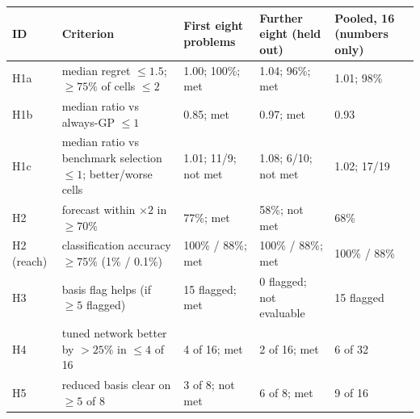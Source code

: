 \begin{tabular}{p{1.3cm}p{4.4cm}p{3.4cm}p{3.6cm}p{3.4cm}}
\toprule
ID & Criterion & First eight problems & Further eight (held out) & Pooled, 16 (numbers only) \\
\midrule
H1a & median regret $\le1.5$; $\ge75\%$ of cells $\le2$ & 1.00; 100\%; met & 1.04; 96\%; met & 1.01; 98\% \\
H1b & median ratio vs always-GP $\le1$ & 0.85; met & 0.97; met & 0.93 \\
H1c & median ratio vs benchmark selection $\le1$; better/worse cells & 1.01; 11/9; not met & 1.08; 6/10; not met & 1.02; 17/19 \\
H2 & forecast within $\times2$ in $\ge70\%$ & 77\%; met & 58\%; not met & 68\% \\
H2 (reach) & classification accuracy $\ge75\%$ (1\% / 0.1\%) & 100\% / 88\%; met & 100\% / 88\%; met & 100\% / 88\% \\
H3 & basis flag helps (if $\ge5$ flagged) & 15 flagged; met & 0 flagged; not evaluable & 15 flagged \\
H4 & tuned network better by $>25\%$ in $\le4$ of 16 & 4 of 16; met & 2 of 16; met & 6 of 32 \\
H5 & reduced basis clear on $\ge5$ of 8 & 3 of 8; not met & 6 of 8; met & 9 of 16 \\
\bottomrule
\end{tabular}
